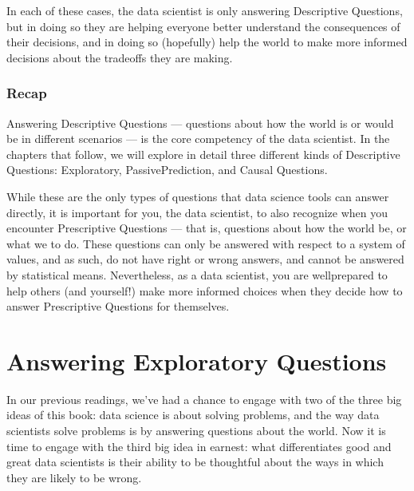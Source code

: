 \documentclass[letterpaper,10pt,english]{jupyterBook}
\begin{document}
\sphinxAtStartPar
In each of these cases, the data scientist is only answering Descriptive Questions, but in doing so they are helping everyone better understand the consequences of their decisions, and in doing so (hopefully) help the world to make more informed decisions about the trade\sphinxhyphen{}offs they are making.


\subsection{Recap}
\label{\detokenize{30_questions/06_descriptive_prescriptive_examples:recap}}
\sphinxAtStartPar
Answering Descriptive Questions — questions about how the world is or would be in different scenarios — is the core competency of the data scientist. In the chapters that follow, we will explore in detail three different kinds of Descriptive Questions: Exploratory, Passive\sphinxhyphen{}Prediction, and Causal Questions.

\sphinxAtStartPar
While these are the only types of questions that data science tools can answer directly, it is important for you, the data scientist, to also recognize when you encounter Prescriptive Questions — that is, questions about how the world  be, or what we  to do. These questions can only be answered with respect to a system of values, and as such, do not have right or wrong answers, and cannot be answered by statistical means. Nevertheless, as a data scientist, you are well\sphinxhyphen{}prepared to help others (and yourself!) make more informed choices when they decide how to answer Prescriptive Questions for themselves.

\sphinxstepscope


\chapter{Answering Exploratory Questions}
\label{\detokenize{30_questions/15_answering_exploratory_questions:answering-exploratory-questions}}\label{\detokenize{30_questions/15_answering_exploratory_questions::doc}}
\sphinxAtStartPar
In our previous readings, we’ve had a chance to engage with two of the three big ideas of this book: data science is about solving problems, and the way data scientists solve problems is by answering questions about the world. Now it is time to engage with the third big idea in earnest: what differentiates good and great data scientists is their ability to be thoughtful about the ways in which they are likely to be wrong.
\end{document}
